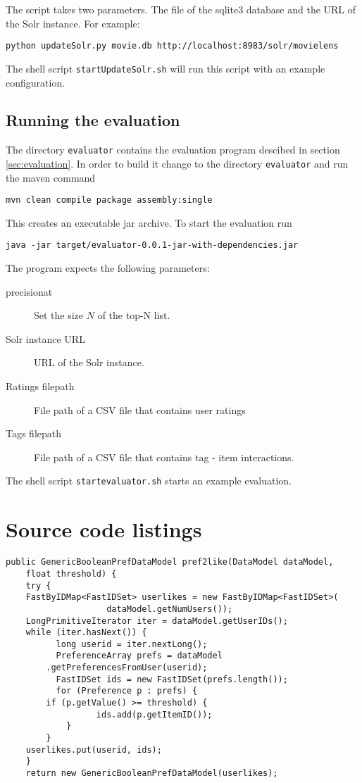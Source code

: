 The script takes two parameters. The file of the sqlite3 database and the URL of the Solr instance. For example:
\begin{verbatim}
python updateSolr.py movie.db http://localhost:8983/solr/movielens
\end{verbatim}

The shell script \verb|startUpdateSolr.sh| will run this script with an example configuration.

\subsection{Running the evaluation}

The directory \verb|evaluator| contains the evaluation program descibed in section \ref{sec:evaluation}. In order to build it change to the directory \verb|evaluator| and run the maven command
\begin{verbatim}
mvn clean compile package assembly:single
\end{verbatim}
This creates an executable jar archive. To start the evaluation run 
\begin{verbatim}
java -jar target/evaluator-0.0.1-jar-with-dependencies.jar
\end{verbatim}

The program expects the following parameters:
\begin{description}
\item[precisionat] Set the size $N$ of the top-N list.
\item[Solr instance URL] URL of the Solr instance.
\item[Ratings filepath] File path of a CSV file that contains user ratings
\item[Tags filepath] File path of a CSV file that contains tag - item interactions.
\end{description}

The shell script \verb|startevaluator.sh| starts an example evaluation.

\section{Source code listings}
\label{sec:listings}

\begin{lstlisting}[caption={To simulate the user action ``like'' we extract all ratings equal or above a score of 4.0 and use the result as training set},label={lst:pref2like}]
 public GenericBooleanPrefDataModel pref2like(DataModel dataModel,
	float threshold) {
	try {
	FastByIDMap<FastIDSet> userlikes = new FastByIDMap<FastIDSet>(
					dataModel.getNumUsers());
	LongPrimitiveIterator iter = dataModel.getUserIDs();
	while (iter.hasNext()) {
          long userid = iter.nextLong();
          PreferenceArray prefs = dataModel
		.getPreferencesFromUser(userid);
          FastIDSet ids = new FastIDSet(prefs.length());
          for (Preference p : prefs) {
		if (p.getValue() >= threshold) {
                  ids.add(p.getItemID());
			}
		}
	userlikes.put(userid, ids);
	}
    return new GenericBooleanPrefDataModel(userlikes);
\end{lstlisting}


